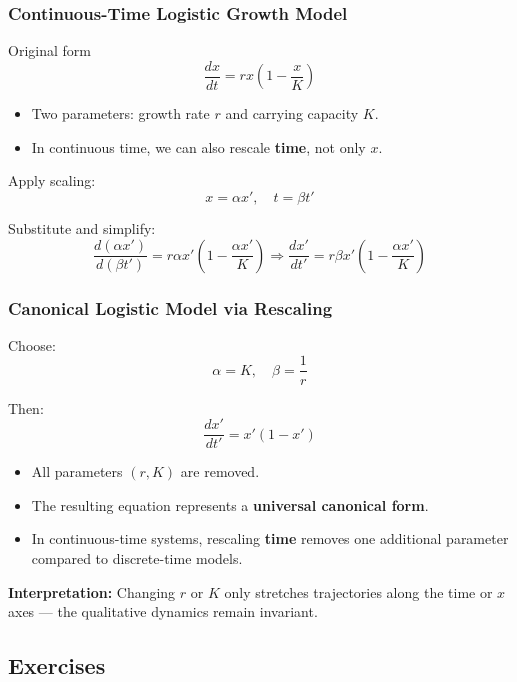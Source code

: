 \documentclass{beamer}
\begin{document}
\begin{frame}
\frametitle{Continuous-Time Logistic Growth Model}

\begin{block}{Original form}
\[
\frac{dx}{dt} = r x \left(1 - \frac{x}{K}\right)
\]
\end{block}

\begin{itemize}
    \item Two parameters: growth rate $r$ and carrying capacity $K$.
    \item In continuous time, we can also rescale \textbf{time}, not only $x$.
\end{itemize}


Apply scaling:
\[
x = \alpha x', \quad t = \beta t'
\]

Substitute and simplify:
\[
\frac{d(\alpha x')}{d(\beta t')} = r \alpha x'\left(1 - \frac{\alpha x'}{K}\right)
\Rightarrow
\frac{dx'}{dt'} = r \beta x' \left(1 - \frac{\alpha x'}{K}\right)
\]
\end{frame}

\begin{frame}
\frametitle{Canonical Logistic Model via Rescaling}

Choose:
\[
\alpha = K, \quad \beta = \frac{1}{r}
\]

Then:
\[
\frac{dx'}{dt'} = x'(1 - x')
\]

\begin{itemize}
    \item All parameters $(r, K)$ are removed.
    \item The resulting equation represents a \textbf{universal canonical form}.
    \item In continuous-time systems, rescaling \textbf{time} removes one additional parameter compared to discrete-time models.
\end{itemize}

\vspace{0.3cm}
\textbf{Interpretation:}  
Changing $r$ or $K$ only stretches trajectories along the time or $x$ axes —  
the qualitative dynamics remain invariant.
\end{frame}

\subsection{Exercises}
\end{document}
